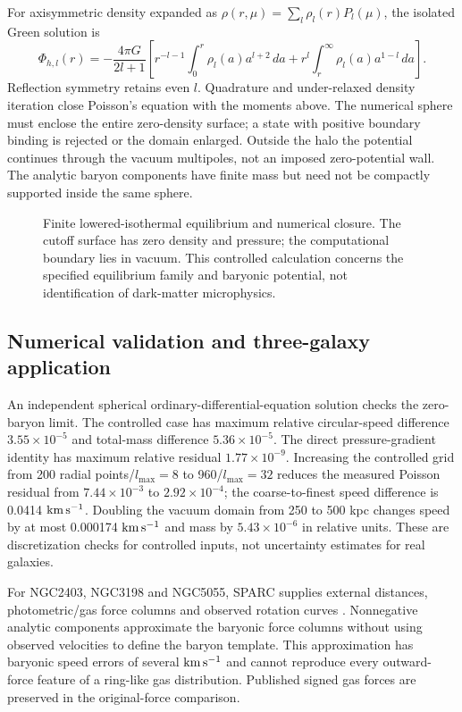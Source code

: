 \documentclass[10pt]{article}
\begin{document}
For axisymmetric density expanded as $\rho(r,\mu)=\sum_l\rho_l(r)P_l(\mu)$,
the isolated Green solution is
\begin{equation}
 \Phi_{h,l}(r)=-\frac{4\pi G}{2l+1}
 \left[r^{-l-1}\int_0^r\rho_l(a)a^{l+2}\,da
 +r^l\int_r^\infty\rho_l(a)a^{1-l}\,da\right].
\end{equation}
Reflection symmetry retains even $l$. Quadrature and under-relaxed density
iteration close Poisson's equation with the moments above. The numerical
sphere must enclose the entire zero-density surface; a state with positive
boundary binding is rejected or the domain enlarged. Outside the halo the
potential continues through the vacuum multipoles, not an imposed zero-potential
wall. The analytic baryon components have finite mass but need not be
compactly supported inside the same sphere.

\begin{figure}[tb]
\centering{}
\caption{Finite lowered-isothermal equilibrium and numerical closure.
The cutoff surface has zero density and pressure; the computational boundary
lies in vacuum. This controlled calculation concerns the specified equilibrium
family and baryonic potential, not identification of dark-matter microphysics.}
\end{figure}

\subsection{Numerical validation and three-galaxy application}
An independent spherical ordinary-differential-equation solution checks the
zero-baryon limit. The controlled case has maximum relative circular-speed
difference $3.55\times10^{-5}$ and total-mass difference
$5.36\times10^{-5}$. The direct pressure-gradient identity has maximum
relative residual $1.77\times10^{-9}$. Increasing the controlled grid from
200 radial points/$l_{\max}=8$ to 960/$l_{\max}=32$ reduces the measured
Poisson residual from $7.44\times10^{-3}$ to $2.92\times10^{-4}$; the
coarse-to-finest speed difference is 0.0414 $\mathrm{km\,s^{-1}}$. Doubling the vacuum
domain from 250 to 500 kpc changes speed by at most
0.000174 $\mathrm{km\,s^{-1}}$ and mass by $5.43\times10^{-6}$ in relative units.
These are discretization checks for controlled inputs, not uncertainty
estimates for real galaxies.

For NGC2403, NGC3198 and NGC5055, SPARC supplies external distances,
photometric/gas force columns and observed rotation curves \citep{lelli2016}.
Nonnegative analytic components approximate the baryonic force columns without
using observed velocities to define the baryon template. This approximation
has baryonic speed errors of several $\mathrm{km\,s^{-1}}$ and cannot reproduce every
outward-force feature of a ring-like gas distribution. Published signed gas
forces are preserved in the original-force comparison.
\end{document}

